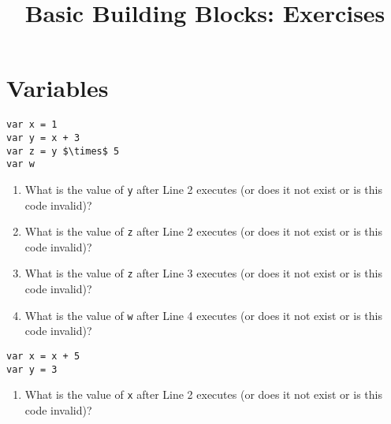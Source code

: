 \documentclass{article}
\title{Basic Building Blocks: Exercises}
\begin{document}
\maketitle

\section{Variables}

\begin{Exercise}

\begin{lstlisting}[caption={Pseudocode.}, label={code:exercise_var_1}, mathescape]
var x = 1
var y = x + 3
var z = y $\times$ 5
var w
\end{lstlisting}

\begin{enumerate}
\item What is the value of \lstinline{y} after Line 2 executes (or does it not exist or is this code invalid)?
\item What is the value of \lstinline{z} after Line 2 executes (or does it not exist or is this code invalid)?
\item What is the value of \lstinline{z} after Line 3 executes (or does it not exist or is this code invalid)?
\item What is the value of \lstinline{w} after Line 4 executes (or does it not exist or is this code invalid)?
\end{enumerate}

\end{Exercise}

\begin{Exercise}

\begin{lstlisting}[caption={Pseudocode.}, label={code:exercise_var_2}]
var x = x + 5
var y = 3
\end{lstlisting}

\begin{enumerate}
\item What is the value of \lstinline{x} after Line 2 executes (or does it not exist or is this code invalid)?
\end{enumerate}

\end{Exercise}
\end{document}
